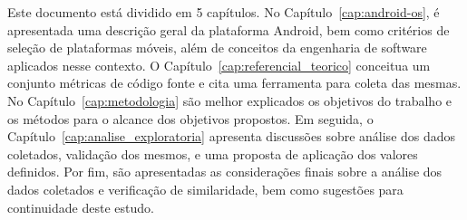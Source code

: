 Este documento está dividido em 5 capítulos. No Capítulo~\ref{cap:android-os}, é apresentada uma descrição geral da plataforma Android, bem como critérios de seleção de plataformas móveis, além de conceitos da engenharia de software aplicados nesse contexto. O Capítulo~\ref{cap:referencial_teorico} conceitua um conjunto métricas de código fonte e cita uma ferramenta para coleta das mesmas. No Capítulo~\ref{cap:metodologia} são melhor explicados os objetivos do trabalho e os métodos para o alcance dos objetivos propostos. Em seguida, o Capítulo~\ref{cap:analise_exploratoria} apresenta discussões sobre análise dos dados coletados, validação dos mesmos, e uma proposta de aplicação dos valores definidos. Por fim, são apresentadas as considerações finais sobre a análise dos dados coletados e verificação de similaridade, bem como sugestões para continuidade deste estudo.

